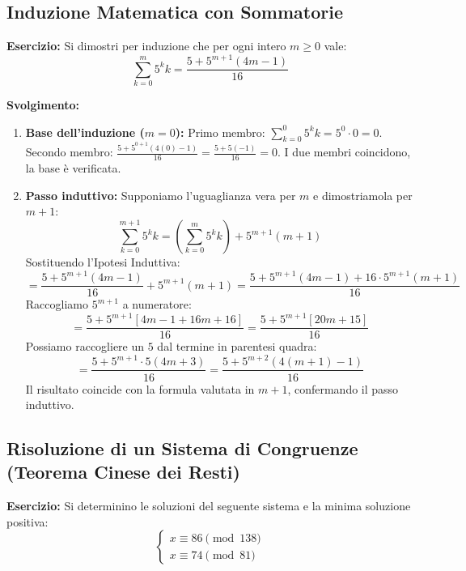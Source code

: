 \documentclass[12pt, a4paper]{article}
\begin{document}
\subsection{Induzione Matematica con Sommatorie}
\textbf{Esercizio:} Si dimostri per induzione che per ogni intero $m \ge 0$ vale:
\[ \sum_{k=0}^{m} 5^k k = \frac{5 + 5^{m+1}(4m - 1)}{16} \]

\textbf{Svolgimento:}
\begin{enumerate}
    \item \textbf{Base dell'induzione ($m=0$):}
    Primo membro: $\sum_{k=0}^{0} 5^k k = 5^0 \cdot 0 = 0$.
    Secondo membro: $\frac{5 + 5^{0+1}(4(0) - 1)}{16} = \frac{5 + 5(-1)}{16} = 0$.
    I due membri coincidono, la base è verificata.
    
    \item \textbf{Passo induttivo:} Supponiamo l'uguaglianza vera per $m$ e dimostriamola per $m+1$:
    \[ \sum_{k=0}^{m+1} 5^k k = \left( \sum_{k=0}^{m} 5^k k \right) + 5^{m+1}(m+1) \]
    Sostituendo l'Ipotesi Induttiva:
    \[ = \frac{5 + 5^{m+1}(4m - 1)}{16} + 5^{m+1}(m+1) = \frac{5 + 5^{m+1}(4m - 1) + 16 \cdot 5^{m+1}(m+1)}{16} \]
    Raccogliamo $5^{m+1}$ a numeratore:
    \[ = \frac{5 + 5^{m+1}[4m - 1 + 16m + 16]}{16} = \frac{5 + 5^{m+1}[20m + 15]}{16} \]
    Possiamo raccogliere un $5$ dal termine in parentesi quadra:
    \[ = \frac{5 + 5^{m+1} \cdot 5(4m + 3)}{16} = \frac{5 + 5^{m+2}(4(m+1) - 1)}{16} \]
    Il risultato coincide con la formula valutata in $m+1$, confermando il passo induttivo.
\end{enumerate}

\subsection{Risoluzione di un Sistema di Congruenze (Teorema Cinese dei Resti)}
\textbf{Esercizio:} Si determinino le soluzioni del seguente sistema e la minima soluzione positiva:
\[
\begin{cases}
    x \equiv 86 \pmod{138} \\
    x \equiv 74 \pmod{81}
\end{cases}
\]
\end{document}
